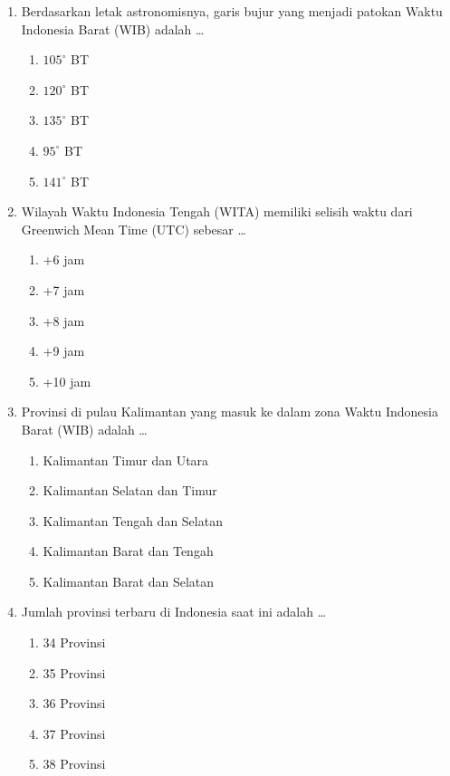 \documentclass[12pt,a4paper]{article}
\begin{document}
\begin{enumerate}[leftmargin=*]
\item Berdasarkan letak astronomisnya, garis bujur yang menjadi patokan Waktu Indonesia Barat (WIB) adalah \dots
    \begin{enumerate}[label=\alph*.]
        \item $105^{\circ}$ BT
        \item $120^{\circ}$ BT
        \item $135^{\circ}$ BT
        \item $95^{\circ}$ BT
        \item $141^{\circ}$ BT
    \end{enumerate}

\item Wilayah Waktu Indonesia Tengah (WITA) memiliki selisih waktu dari Greenwich Mean Time (UTC) sebesar \dots
    \begin{enumerate}[label=\alph*.]
        \item +6 jam
        \item +7 jam
        \item +8 jam
        \item +9 jam
        \item +10 jam
    \end{enumerate}

\item Provinsi di pulau Kalimantan yang masuk ke dalam zona Waktu Indonesia Barat (WIB) adalah \dots
    \begin{enumerate}[label=\alph*.]
        \item Kalimantan Timur dan Utara
        \item Kalimantan Selatan dan Timur
        \item Kalimantan Tengah dan Selatan
        \item Kalimantan Barat dan Tengah
        \item Kalimantan Barat dan Selatan
    \end{enumerate}

\item Jumlah provinsi terbaru di Indonesia saat ini adalah \dots
    \begin{enumerate}[label=\alph*.]
        \item 34 Provinsi
        \item 35 Provinsi
        \item 36 Provinsi
        \item 37 Provinsi
        \item 38 Provinsi
    \end{enumerate}


\end{enumerate}
\end{document}
